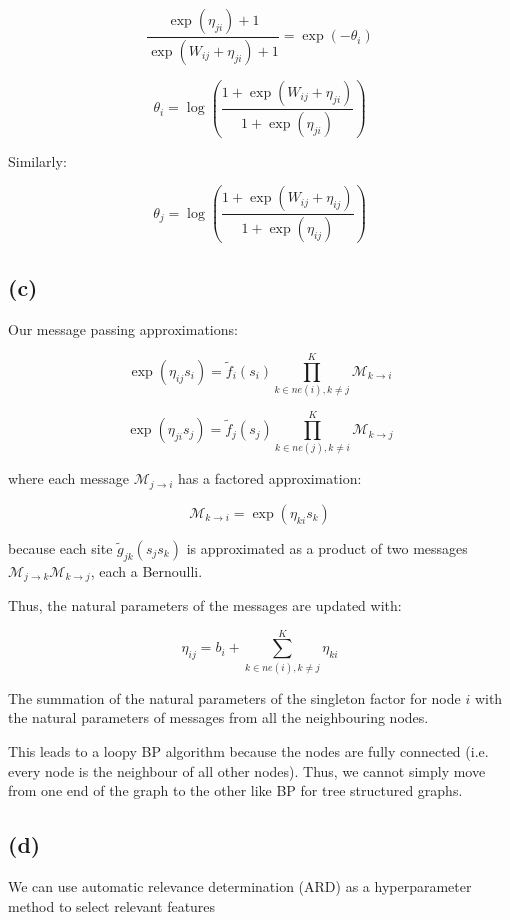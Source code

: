 \documentclass[12pt]{article}
\begin{document}
\[\frac{\exp\left( \eta_{ji}\right) +  1}{ \exp\left( W_{ij} + \eta_{ji}\right) +  1 } =\exp{\left(-\theta_i\right)}\]

\[\theta_i = \log \left( \frac{ 1+\exp\left( W_{ij} + \eta_{ji}\right) }{1+\exp\left( \eta_{ji}\right)} \right)\]

Similarly:

\[\theta_j = \log \left( \frac{ 1+ \exp\left( W_{ij} + \eta_{ij}\right)  }{1+\exp\left( \eta_{ij}\right)} \right)\]

\newpage

\subsection*{(c)}

Our message passing approximations:

\[\exp(\eta_{ij} s_i) = \tilde{f}_{i}(s_{i}) \prod_{k\in ne(i), k\neq j}^{K} \mathcal{M}_{k \rightarrow i} \]

\[\exp(\eta_{ji} s_j) = \tilde{f}_{j}(s_{j}) \prod_{k\in ne(j), k\neq i}^{K} \mathcal{M}_{k \rightarrow j}\]

where each message $\mathcal{M}_{j \rightarrow i}$ has a factored approximation:

\[\mathcal{M}_{k \rightarrow i} = \exp(\eta_{ki} s_k) \]

because each site $\tilde{g}_{jk}(s_j s_k)$ is approximated as a product of two messages $\mathcal{M}_{j \rightarrow k}\mathcal{M}_{k \rightarrow j}$, each a Bernoulli.

Thus, the natural parameters of the messages are updated with:

\[\eta_{ij} = b_i + \sum_{k\in ne(i), k\neq j}^{K} \eta_{ki} \]

The summation of the natural parameters of the singleton factor for node $i$ with the natural parameters of messages from all the neighbouring nodes.

This leads to a loopy BP algorithm because the nodes are fully connected (i.e. every node is the neighbour of all other nodes). Thus, we cannot simply move from one end of the graph to the other like BP for tree structured graphs.

\subsection*{(d)}

We can use automatic relevance determination (ARD) as a hyperparameter method to select relevant features
\end{document}

